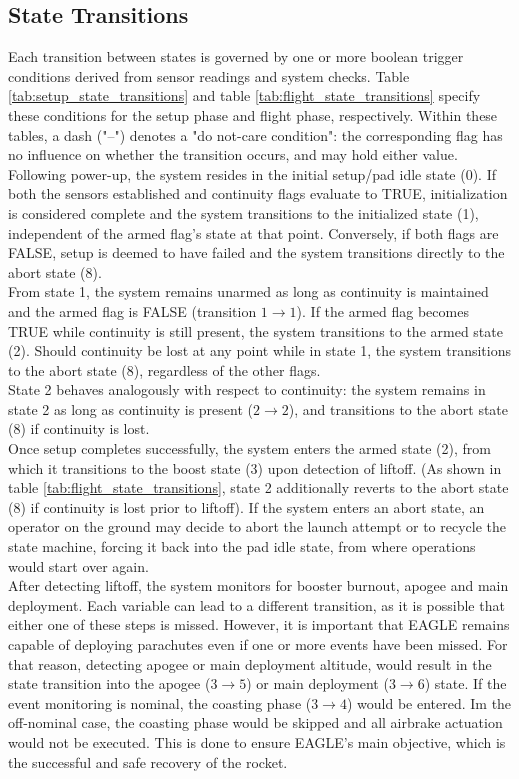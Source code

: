 \documentclass[fontsize=11pt,%
twoside,%
BCOR          = 8mm, %
DIV           = 11,  %
titlepage     = off,%
index=totoc,%
xcolor        = pdftex,%
dvipsnames,%
bibliography  = totoc,%
bibliography = numbered, %
listof        = notnumbered]{scrreprt}
\begin{document}
\subsection{State Transitions}
Each transition between states is governed by one or more boolean trigger conditions derived from sensor readings and system checks. Table \ref{tab:setup_state_transitions} and table \ref{tab:flight_state_transitions} specify these conditions for the setup phase and flight phase, respectively. Within these tables, a dash ("–") denotes a "do not-care condition": the corresponding flag has no influence on whether the transition occurs, and may hold either value.\\
Following power-up, the system resides in the initial setup/pad idle state (0). If both the sensors established and continuity flags evaluate to TRUE, initialization is considered complete and the system transitions to the initialized state (1), independent of the armed flag's state at that point. Conversely, if both flags are FALSE, setup is deemed to have failed and the system transitions directly to the abort state (8).\\
From state 1, the system remains unarmed as long as continuity is maintained and the armed flag is FALSE (transition $1\rightarrow1$). If the armed flag becomes TRUE while continuity is still present, the system transitions to the armed state (2). Should continuity be lost at any point while in state 1, the system transitions to the abort state (8), regardless of the other flags.\\
State 2 behaves analogously with respect to continuity: the system remains in state 2 as long as continuity is present ($2\rightarrow2$), and transitions to the abort state (8) if continuity is lost.\\
Once setup completes successfully, the system enters the armed state (2), from which it transitions to the boost state (3) upon detection of liftoff. (As shown in table \ref{tab:flight_state_transitions}, state 2 additionally reverts to the abort state (8) if continuity is lost prior to liftoff).
If the system enters an abort state, an operator on the ground may decide to abort the launch attempt or to recycle the state machine, forcing it back into the pad idle state, from where operations would start over again.\\
After detecting liftoff, the system monitors for booster burnout, apogee and main deployment. Each variable can lead to a different transition, as it is possible that either one of these steps is missed. However, it is important that EAGLE remains capable of deploying parachutes even if one or more events have been missed. For that reason, detecting apogee or main deployment altitude, would result in the state transition into the apogee ($3\rightarrow5$) or main deployment ($3\rightarrow6$) state. If the event monitoring is nominal, the coasting phase ($3\rightarrow4$) would be entered. Im the off-nominal case, the coasting phase would be skipped and all airbrake actuation would not be executed. This is done to ensure EAGLE's main objective, which is the successful and safe recovery of the rocket.\\
\end{document}
